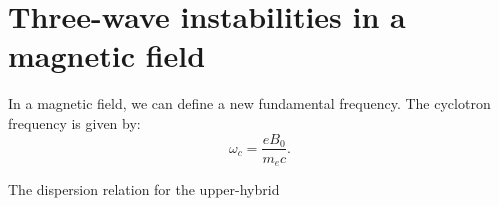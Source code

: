 \section{Three-wave instabilities in a magnetic field}

In a magnetic field, we can define a new fundamental frequency. The cyclotron frequency is given by:
\begin{equation}
\omega_c = \frac{eB_0}{m_ec}.
\end{equation}

The dispersion relation for the upper-hybrid 



%
%
